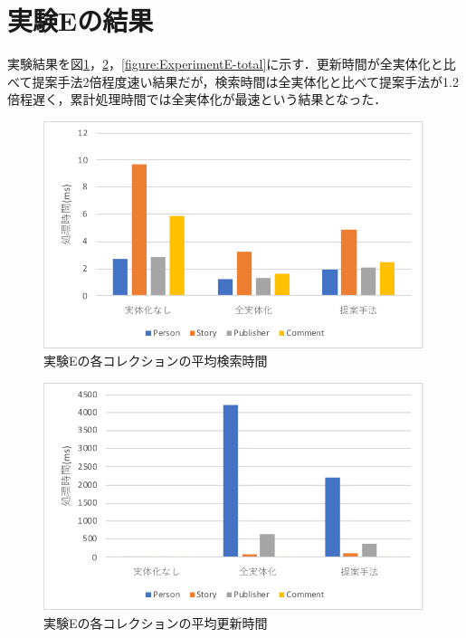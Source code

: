 \documentclass[a4paper,11pt]{ujreport}
\begin{document}
\section{実験Eの結果}
実験結果を図\ref{figure:ExperimentE-find}，\ref{figure:ExperimentE-update}，\ref{figure:ExperimentE-total}に示す．更新時間が全実体化と比べて提案手法2倍程度速い結果だが，検索時間は全実体化と比べて提案手法が1.2倍程遅く，累計処理時間では全実体化が最速という結果となった．
\begin{figure}[htbp]
	\begin{center}
		\includegraphics[width=30em]{src/ExperimentE-find.pdf} %
	\end{center}
	\caption{実験Eの各コレクションの平均検索時間}
	\label{figure:ExperimentE-find}
\end{figure}
\begin{figure}[htbp]
	\begin{center}
		\includegraphics[width=30em]{src/ExperimentE-update.pdf} %
	\end{center}
	\caption{実験Eの各コレクションの平均更新時間}
	\label{figure:ExperimentE-update}
\end{figure}
\end{document}
